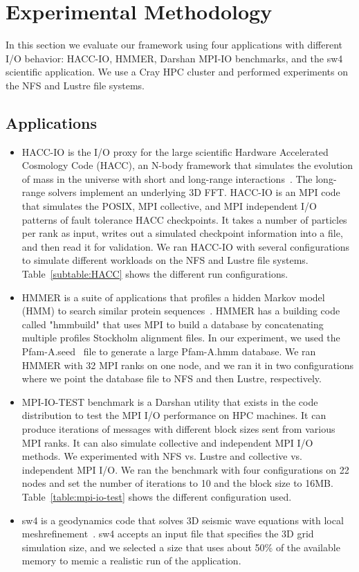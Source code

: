 \section{Experimental Methodology}\label{sec:methodology}
In this section we evaluate our framework using four applications with
different I/O behavior: HACC-IO, HMMER, Darshan MPI-IO benchmarks, and
the sw4 scientific application. We use a Cray HPC cluster and
performed experiments on the NFS and Lustre file systems.

\subsection{Applications}
\begin{itemize}
	\item HACC-IO is the I/O proxy for the large scientific Hardware Accelerated Cosmology Code (HACC), an N-body framework that simulates the evolution of mass in the universe with short and long-range interactions~\cite{habib2013hacc}. The long-range solvers implement an underlying 3D FFT. HACC-IO is an MPI code that simulates the POSIX, MPI collective, and MPI independent I/O patterns of fault tolerance HACC checkpoints. It takes a number of particles per rank as input, writes out a simulated checkpoint information into a file, and then read it for validation. We ran HACC-IO with several configurations to simulate different workloads on the NFS and Lustre file systems. Table~\ref{subtable:HACC} shows the different run configurations. 
	\item HMMER is a suite of applications that profiles a hidden Markov model (HMM) to search similar protein sequences~\cite{eddy1992hmmer}. HMMER has a building code called "hmmbuild" that uses MPI to build a database by concatenating multiple profiles Stockholm alignment files. In our experiment, we used the Pfam-A.seed~\cite{sonnhammer1998pfam} file to generate a large Pfam-A.hmm database. We ran HMMER with 32 MPI ranks on one node, and we ran it in two configurations where we point the database file to NFS and then Lustre, respectively. 
	\item MPI-IO-TEST benchmark is a Darshan utility that exists in the code distribution to test the MPI I/O performance on HPC machines. It can produce iterations of messages with different block sizes sent from various MPI ranks. It can also simulate collective and independent MPI I/O methods. We experimented with NFS vs. Lustre and collective vs. independent MPI I/O. We ran the benchmark with four configurations on 22 nodes and set the number of iterations to 10 and the block size to 16MB. Table~\ref{table:mpi-io-test} shows the different configuration used.
	\item sw4 is a geodynamics code that solves 3D seismic wave equations with local meshrefinement~\cite{peterssonsw4}. sw4 accepts an input file that specifies the 3D grid simulation size, and we selected a size that uses about 50\% of the available memory to memic a realistic run of the application.
\end{itemize}

